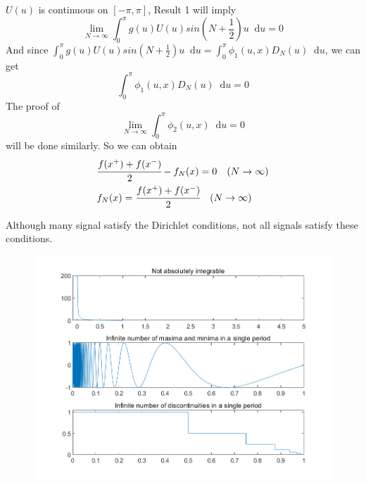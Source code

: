 \documentclass[margin,line]{res}
\newcommand*{\dif}{\mathop{}\!\mathrm{d}}
\begin{document}
\begin{resume}
\begin{itemize}
$$$$
$U(u)$ is continuous on $\left[-\pi,\pi\right]$, Result 1 will imply
$$
\lim_{N \rightarrow \infty}\int_{0}^{\pi}g(u)U(u)sin(N+\frac{1}{2})u \dif u = 0
$$
And since $\int_{0}^{\pi}g(u)U(u)sin(N+\frac{1}{2})u \dif u = \int_{0}^{\pi}\phi_{1}(u,x)D_N(u)\dif u$, we can get
$$
\int_{0}^{\pi} \phi_{1}(u,x)D_N(u)\dif u = 0
$$
The proof of 
$$
\lim_{N \rightarrow \infty}\int_{0}^{\pi}\phi_{2}(u,x)\dif u=0
$$
will be done similarly.
So we can obtain 
\begin{align}
	& \cfrac{f(x^{+})+f(x^{-})}{2}-f_N(x)=0 \quad (N \rightarrow \infty) \nonumber \\
	& f_N(x)=\cfrac{f(x^{+})+f(x^{-})}{2} \quad (N \rightarrow \infty) \nonumber
\end{align}
\end{itemize}
Although many signal satisfy the Dirichlet conditions, not all signals satisfy these conditions.
\begin{figure}[H]
	\centerline{\includegraphics[width=0.55\linewidth]{figure/fig_6.png}}
\end{figure}

\end{resume}
\end{document}
